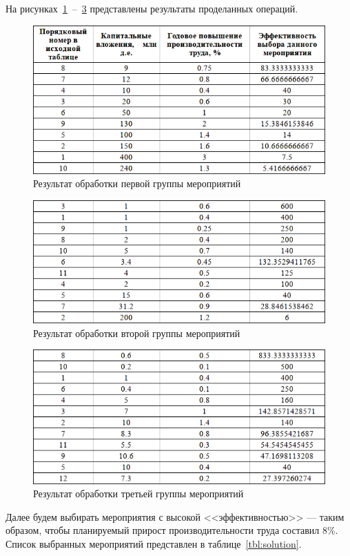 На рисунках~\ref{fig:tabl12}~--~\ref{fig:tabl14} представлены результаты проделанных операций.

\begin{figure}[htbp]
  \centering
  \includegraphics[width=0.8\linewidth]{img/tabl12}
  \caption{Результат обработки первой группы мероприятий}\label{fig:tabl12}
\end{figure}

\begin{figure}[htbp]
  \centering
  \includegraphics[width=0.8\linewidth]{img/tabl13}
  \caption{Результат обработки второй группы мероприятий}\label{fig:tabl13}
\end{figure}

\begin{figure}[htbp]
  \centering
  \includegraphics[width=0.8\linewidth]{img/tabl14}
  \caption{Результат обработки третьей группы мероприятий}\label{fig:tabl14}
\end{figure}

\newpage

Далее будем выбирать мероприятия с высокой <<эффективностью>> --- таким образом,
чтобы планируемый прирост производительности труда составил 8\%.
Список выбранных мероприятий представлен в таблице~\ref{tbl:solution}.

